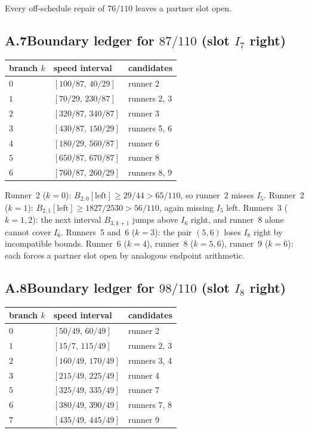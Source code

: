 \documentclass[12pt,a4paper]{amsart}
\theoremstyle{definition}
\theoremstyle{remark}
\begin{document}
Every off-schedule repair of $76/110$ leaves a partner slot open.

\subsection*{A.7\quad Boundary ledger for $87/110$ (slot $I_7$ right)}

\begin{center}
\begin{tabular}{lll}
\toprule
branch $k$ & speed interval & candidates \\
\midrule
$0$ & $[100/87,\,40/29]$ & runner 2 \\
$1$ & $[70/29,\,230/87]$ & runners 2, 3 \\
$2$ & $[320/87,\,340/87]$ & runner 3 \\
$3$ & $[430/87,\,150/29]$ & runners 5, 6 \\
$4$ & $[180/29,\,560/87]$ & runner 6 \\
$5$ & $[650/87,\,670/87]$ & runner 8 \\
$6$ & $[760/87,\,260/29]$ & runners 8, 9 \\
\bottomrule
\end{tabular}
\end{center}

Runner~2 ($k=0$): $B_{2,0}[\mathrm{left}]\ge 29/44>65/110$, so runner~2 misses $I_5$.
Runner~2 ($k=1$): $B_{2,1}[\mathrm{left}]\ge 1827/2530>56/110$, again missing $I_5$ left.
Runners~3 ($k=1,2$): the next interval $B_{3,k+1}$ jumps above $I_6$ right, and runner~8
alone cannot cover $I_6$. Runners~5 and~6 ($k=3$): the pair $(5,6)$ loses $I_8$ right
by incompatible bounds. Runner~6 ($k=4$), runner~8 ($k=5,6$), runner~9 ($k=6$): each
forces a partner slot open by analogous endpoint arithmetic.

\subsection*{A.8\quad Boundary ledger for $98/110$ (slot $I_8$ right)}

\begin{center}
\begin{tabular}{lll}
\toprule
branch $k$ & speed interval & candidates \\
\midrule
$0$ & $[50/49,\,60/49]$ & runner 2 \\
$1$ & $[15/7,\,115/49]$ & runners 2, 3 \\
$2$ & $[160/49,\,170/49]$ & runners 3, 4 \\
$3$ & $[215/49,\,225/49]$ & runner 4 \\
$5$ & $[325/49,\,335/49]$ & runner 7 \\
$6$ & $[380/49,\,390/49]$ & runners 7, 8 \\
$7$ & $[435/49,\,445/49]$ & runner 9 \\
\bottomrule
\end{tabular}
\end{center}
\end{document}

